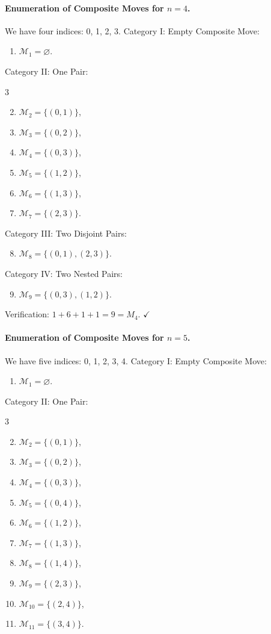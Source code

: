 \documentclass[runningheads]{llncs}
\begin{document}
\paragraph{Enumeration of Composite Moves for $n=4$.} We have four indices: 0, 1, 2, 3.
Category I: Empty Composite Move:
\begin{enumerate}
  \item $\mathcal{M}_1 = \varnothing$.
\end{enumerate}
Category II: One Pair:
\begin{multicols}{3}
\begin{enumerate}
  \setcounter{enumi}{1}
  \item $\mathcal{M}_2 = \{(0,1)\}$,
  \item $\mathcal{M}_3 = \{(0,2)\}$,
  \item $\mathcal{M}_4 = \{(0,3)\}$,
  \item $\mathcal{M}_5 = \{(1,2)\}$,
  \item $\mathcal{M}_6 = \{(1,3)\}$,
  \item $\mathcal{M}_7 = \{(2,3)\}$.
\end{enumerate}
\end{multicols}
Category III: Two Disjoint Pairs:
\begin{enumerate}
  \setcounter{enumi}{7}
  \item $\mathcal{M}_8 = \{(0,1), (2,3)\}$.
\end{enumerate}
Category IV: Two Nested Pairs:
\begin{enumerate}
  \setcounter{enumi}{8}
  \item $\mathcal{M}_9 = \{(0,3), (1,2)\}$.
\end{enumerate}
Verification: $1 + 6 + 1 + 1 = 9 = M_4$. \quad $\checkmark$

\paragraph{Enumeration of Composite Moves for $n=5$.} We have five indices: 0, 1, 2, 3, 4.
Category I: Empty Composite Move:
\begin{enumerate}
  \item $\mathcal{M}_1 = \varnothing$.
\end{enumerate}
Category II: One Pair:
\begin{multicols}{3}
\begin{enumerate}
  \setcounter{enumi}{1}
  \item $\mathcal{M}_2 = \{(0,1)\}$,
  \item $\mathcal{M}_3 = \{(0,2)\}$,
  \item $\mathcal{M}_4 = \{(0,3)\}$,
  \item $\mathcal{M}_5 = \{(0,4)\}$,
  \item $\mathcal{M}_6 = \{(1,2)\}$,
  \item $\mathcal{M}_7 = \{(1,3)\}$,
  \item $\mathcal{M}_8 = \{(1,4)\}$,
  \item $\mathcal{M}_9 = \{(2,3)\}$,
  \item $\mathcal{M}_{10} = \{(2,4)\}$,
  \item $\mathcal{M}_{11} = \{(3,4)\}$.
\end{enumerate}
\end{multicols}
\end{document}
